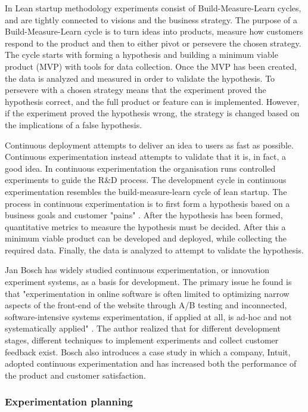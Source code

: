 \documentclass[english]{tktltiki2}
\theoremstyle{definition}
\theoremstyle{remark}
\begin{document}
In Lean startup methodology \cite{ries2011lean} experiments consist of Build-Measure-Learn cycles, and are tightly connected to visions and the business strategy. The purpose of a Build-Measure-Learn cycle is to turn ideas into products, measure how customers respond to the product and then to either pivot or persevere the chosen strategy. The cycle starts with forming a hypothesis and building a minimum viable product (MVP) with tools for data collection. Once the MVP has been created, the data is analyzed and measured in order to validate the hypothesis. To persevere with a chosen strategy means that the experiment proved the hypothesis correct, and the full product or feature can is implemented. However, if the experiment proved the hypothesis wrong, the strategy is changed based on the implications of a false hypothesis.

Continuous deployment attempts to deliver an idea to users as fast as possible. Continuous experimentation instead attempts to validate that it is, in fact, a good idea. In continuous experimentation the organisation runs controlled experiments to guide the R\&D process. The development cycle in continuous experimentation resembles the build-measure-learn cycle of lean startup. The process in continuous experimentation is to first form a hypothesis based on a business goals and customer "pains" \cite{bosch2012building}. After the hypothesis has been formed, quantitative metrics to measure the hypothesis must be decided. After this a minimum viable product can be developed and deployed, while collecting the required data. Finally, the data is analyzed to attempt to validate the hypothesis.

Jan Bosch has widely studied continuous experimentation, or innovation experiment systems, as a basis for development. The primary issue he found is that "experimentation in online software is often limited to optimizing narrow aspects of the front-end of the website through A/B testing and inconnected, software-intensive systems experimentation, if applied at all, is ad-hoc and not systematically applied" \cite{bosch2012building}. The author realized that for different development stages, different techniques to implement experiments and collect customer feedback exist. Bosch also introduces a case study in which a company, Intuit, adopted continuous experimentation and has increased both the performance of the product and customer satisfaction.

\subsubsection{Experimentation planning}
\end{document}
